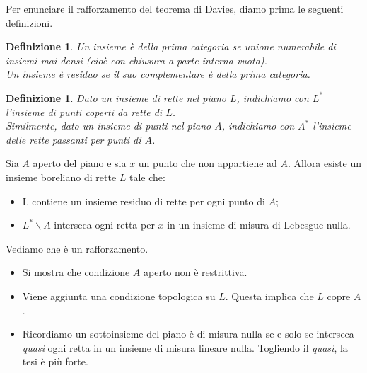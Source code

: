 \documentclass[11pt]{beamer} %
\newcommand{\<}{\langle}
\renewcommand{\>}{\rangle}
\theoremstyle{theorem}
\theoremstyle{theorem}
\theoremstyle{theorem}
\theoremstyle{theorem}
\newtheorem{defin}[teo]{Definizione}
\theoremstyle{theorem}
\begin{document}
\begin{frame}[fragile]
	Per enunciare il rafforzamento del teorema di Davies, diamo prima le seguenti definizioni.\\
	\pause	
	\begin{defin}
	Un insieme è della prima categoria se unione numerabile di insiemi mai densi (cioè con chiusura a parte interna vuota).\\ \pause
	Un insieme è residuo se il suo complementare è della prima categoria. 
	\end{defin}
	\pause
	\begin{defin}
	Dato un insieme di rette nel piano $L$, indichiamo con $L^*$ l'insieme di punti coperti da rette di $L$.\\
	\pause
	Similmente, dato un insieme di punti nel piano $A$, indichiamo con $A^*$ l'insieme delle rette passanti per punti di $A$.
	\end{defin}

\end{frame}

\begin{frame}[fragile]

\begin{lemma}{1}
	Sia $A$ aperto del piano e sia $x$ un punto che non appartiene ad $A$. Allora esiste un insieme boreliano di rette $L$ tale che:\\
	\begin{itemize}
		\item L contiene un insieme residuo di rette per ogni punto di $A$;\\
		\item $L^{*} \backslash A$ interseca ogni retta per $x$ in un insieme di misura di Lebesgue nulla.\\
	\end{itemize}
\end{lemma}
	\pause
	Vediamo che è un rafforzamento.\\
	\pause
	\begin{itemize}
		\item Si mostra che condizione $A$ aperto non è restrittiva.\\
		\pause
		\item Viene aggiunta una condizione topologica su $L$. Questa implica che $L$ copre $A$.\\
		\pause
		\item Ricordiamo un sottoinsieme del piano è di misura nulla se e solo se interseca \emph{quasi} ogni retta in un insieme di misura lineare nulla. Togliendo il \emph{quasi}, la tesi è più forte.\\
	\end{itemize}

\end{frame}
\end{document}
